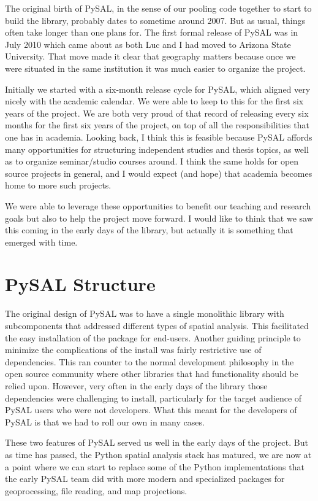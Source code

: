 \documentclass[11pt]{article}
\begin{document}
The original birth of PySAL, in the sense of our pooling code together to start
to build the library, probably dates to sometime around 2007. But as
usual, things often take longer than one plans for. The first formal release of
PySAL was in July 2010 which came about as both Luc and I had moved to Arizona
State University. That move made it clear that geography matters because once
we were situated in the same institution it was much easier to organize the
project. %

Initially we started with a six-month release cycle for PySAL, which aligned
very nicely with the academic calendar. We were able to keep to this for the
first six years of the project. We are both very proud of that record of
releasing every six months for the first six years of the project, on top of
all the responsibilities that one has in academia. Looking back, I think this
is feasible because PySAL affords many opportunities for structuring
independent studies and thesis topics, as well as to organize seminar/studio
courses around. I think the same holds for open source projects in general, and
I would expect (and hope) that academia becomes home to more such projects.

We were able to leverage these opportunities to benefit our teaching and
research goals but also to help the project move forward. I would like to think
that we saw this coming in the early days of the library, but actually it is
something that emerged with time.
\section*{PySAL Structure}
\label{sec:orgc598589}
The original design of PySAL was to have a single monolithic library with
subcomponents that addressed different types of spatial analysis. This
facilitated the easy installation of the package for end-users. Another guiding
principle to minimize the complications of the install was fairly restrictive
use of dependencies. This ran counter to the normal development philosophy in
the open source community where other libraries that had functionality should be
relied upon. However, very often in the early days of the library 
those dependencies were challenging to install, particularly for the target
audience of PySAL users who were not developers. What this meant for the
developers of PySAL is that we had to roll our own in many cases.

These two features of PySAL served us well in the early days of the project.
But as time has passed, the Python spatial analysis stack has matured, we are
now at a point where we can start to replace some of the Python implementations
that the early PySAL team did with more modern and specialized packages for
geoprocessing, file reading, and map projections.
\end{document}
